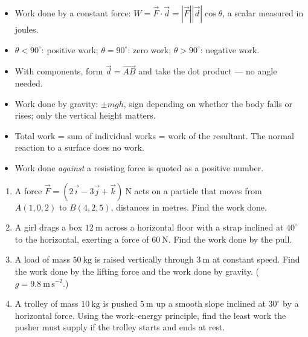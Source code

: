 \documentclass[11pt]{article}
\begin{document}
\begin{aretenir}
\begin{itemize}
\item Work done by a constant force: $W = \vec{F}\cdot\vec{d} = |\vec{F}||\vec{d}|\cos\theta$, a scalar measured in joules.
\item $\theta < 90^{\circ}$: positive work; $\theta = 90^{\circ}$: zero work; $\theta > 90^{\circ}$: negative work.
\item With components, form $\vec{d} = \overrightarrow{AB}$ and take the dot product — no angle needed.
\item Work done by gravity: $\pm mgh$, sign depending on whether the body falls or rises; only the vertical height matters.
\item Total work = sum of individual works = work of the resultant. The normal reaction to a surface does no work.
\item Work done \emph{against} a resisting force is quoted as a positive number.
\end{itemize}
\end{aretenir}

\begin{exercice}[Practice]
\begin{enumerate}
\item A force $\vec{F} = (2\vec{i} - 3\vec{j} + \vec{k})\ \mathrm{N}$ acts on a particle that moves from $A(1,0,2)$ to $B(4,2,5)$, distances in metres. Find the work done.
\item A girl drags a box $12\ \mathrm{m}$ across a horizontal floor with a strap inclined at $40^{\circ}$ to the horizontal, exerting a force of $60\ \mathrm{N}$. Find the work done by the pull.
\item A load of mass $50\ \mathrm{kg}$ is raised vertically through $3\ \mathrm{m}$ at constant speed. Find the work done by the lifting force and the work done by gravity. ($g = 9.8\ \mathrm{m\,s^{-2}}$.)
\item A trolley of mass $10\ \mathrm{kg}$ is pushed $5\ \mathrm{m}$ up a smooth slope inclined at $30^{\circ}$ by a horizontal force. Using the work--energy principle, find the least work the pusher must supply if the trolley starts and ends at rest.
\end{enumerate}
\end{exercice}
\end{document}
